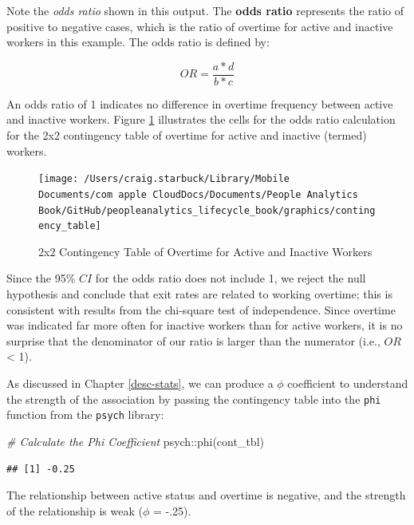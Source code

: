 \documentclass[
]{book}
\newenvironment{Shaded}{\begin{snugshade}}{\end{snugshade}}
\newcommand{\CommentTok}[1]{\textcolor[rgb]{0.56,0.35,0.01}{\textit{#1}}}
\newcommand{\FunctionTok}[1]{\textcolor[rgb]{0.00,0.00,0.00}{#1}}
\newcommand{\NormalTok}[1]{#1}
\newcommand{\SpecialCharTok}[1]{\textcolor[rgb]{0.00,0.00,0.00}{#1}}
\begin{document}
Note the \emph{odds ratio} shown in this output. The \textbf{odds ratio} represents the ratio of positive to negative cases, which is the ratio of overtime for active and inactive workers in this example. The odds ratio is defined by:

\[OR = \frac{a*d}{b*c}\]

An odds ratio of 1 indicates no difference in overtime frequency between active and inactive workers. Figure \ref{fig:contingency-tbl} illustrates the cells for the odds ratio calculation for the 2x2 contingency table of overtime for active and inactive (termed) workers.

\begin{figure}

{\centering \texttt{[image: /Users/craig.starbuck/Library/Mobile Documents/com~apple~CloudDocs/Documents/People Analytics Book/GitHub/peopleanalytics\_lifecycle\_book/graphics/contingency\_table]} 

}

\caption{2x2 Contingency Table of Overtime for Active and Inactive Workers}\label{fig:contingency-tbl}
\end{figure}

Since the 95\% \(CI\) for the odds ratio does not include 1, we reject the null hypothesis and conclude that exit rates are related to working overtime; this is consistent with results from the chi-square test of independence. Since overtime was indicated far more often for inactive workers than for active workers, it is no surprise that the denominator of our ratio is larger than the numerator (i.e., \(OR\) \textless{} 1).

As discussed in Chapter \ref{desc-stats}, we can produce a \(\phi\) coefficient to understand the strength of the association by passing the contingency table into the \texttt{phi} function from the \texttt{psych} library:

\begin{Shaded}
\begin{Highlighting}[]
\CommentTok{\# Calculate the Phi Coefficient}
\NormalTok{psych}\SpecialCharTok{::}\FunctionTok{phi}\NormalTok{(cont\_tbl)}
\end{Highlighting}
\end{Shaded}

\begin{verbatim}
## [1] -0.25
\end{verbatim}

The relationship between active status and overtime is negative, and the strength of the relationship is weak (\(\phi\) = -.25).
\end{document}
